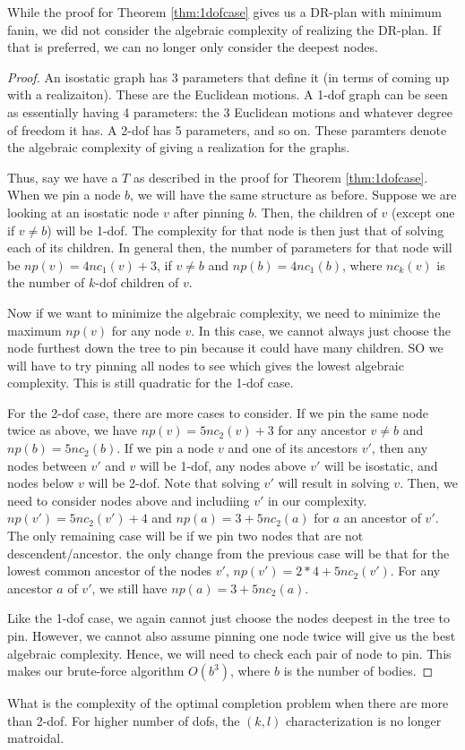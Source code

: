 \begin{observation}
    While the proof for Theorem \ref{thm:1dofcase} gives us a DR-plan with minimum fanin, we did not consider the algebraic complexity of realizing the DR-plan. If that is preferred, we can no longer only consider the deepest nodes.
\end{observation}

\begin{proof}
    An isostatic graph has 3 parameters that define it (in terms of coming up with a realizaiton). These are the Euclidean motions. A 1-dof graph can be seen as essentially having 4 parameters: the 3 Euclidean motions and whatever degree of freedom it has. A 2-dof has 5 parameters, and so on. These paramters denote the algebraic complexity of giving a realization for the graphs.

    Thus, say we have a $T$ as described in the proof for Theorem \ref{thm:1dofcase}. When we pin a node $b$, we will have the same structure as before. Suppose we are looking at an isostatic node $v$ after pinning $b$. Then, the children of $v$ (except one if $v \neq b$) will be 1-dof. The complexity for that node is then just that of solving each of its children. In general then, the number of parameters for that node will be $np(v) = 4nc_1(v)+3$, if $v \neq b$ and $np(b) = 4nc_1(b)$, where $nc_k(v)$ is the number of $k$-dof children of $v$.

    Now if we want to minimize the algebraic complexity, we need to minimize the maximum $np(v)$ for any node $v$. In this case, we cannot always just choose the node furthest down the tree to pin because it could have many children. SO we will have to try pinning all nodes to see which gives the lowest algebraic complexity. This is still quadratic for the 1-dof case.

    For the 2-dof case, there are more cases to consider. If we pin the same node twice as above, we have $np(v) = 5nc_2(v)+3$ for any ancestor $v \neq b$ and $np(b) = 5nc_2(b)$. If we pin a node $v$ and one of its ancestors $v'$, then any nodes between $v'$ and $v$ will be 1-dof, any nodes above $v'$ will be isostatic, and nodes below $v$ will be 2-dof. Note that solving $v'$ will result in solving $v$. Then, we need to consider nodes above and includiing $v'$ in our complexity. $np(v') = 5nc_2(v') + 4$ and $np(a) = 3 + 5nc_2(a)$ for $a$ an ancestor of $v'$. The only remaining case will be if we pin two nodes that are not descendent/ancestor. the only change from the previous case will be that for the lowest common ancestor of the nodes $v'$, $np(v') = 2*4+5nc_2(v')$. For any ancestor $a$ of $v'$, we still have $np(a) = 3 + 5nc_2(a)$.

    Like the 1-dof case, we again cannot just choose the nodes deepest in the tree to pin. However, we cannot also assume pinning one node twice will give us the best algebraic complexity. Hence, we will need to check each pair of node to pin. This makes our brute-force algorithm $O(b^3)$, where $b$ is the number of bodies.
\end{proof}

\begin{openproblem}
    What is the complexity of the optimal completion problem when there are more than 2-dof. For higher number of dofs, the $(k,l)$ characterization is no longer matroidal.
\end{openproblem}
